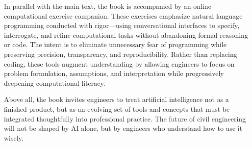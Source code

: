 \documentclass[12pt]{article}
\begin{document}
In parallel with the main text, the book is accompanied by an online computational exercise companion. These exercises emphasize natural language programming conducted with rigor—using conversational interfaces to specify, interrogate, and refine computational tasks without abandoning formal reasoning or code. The intent is to eliminate unnecessary fear of programming while preserving precision, transparency, and reproducibility. Rather than replacing coding, these tools augment understanding by allowing engineers to focus on problem formulation, assumptions, and interpretation while progressively deepening computational literacy.

Above all, the book invites engineers to treat artificial intelligence not as a finished product, but as an evolving set of tools and concepts that must be integrated thoughtfully into professional practice. The future of civil engineering will not be shaped by AI alone, but by engineers who understand how to use it wisely.
\end{document}
